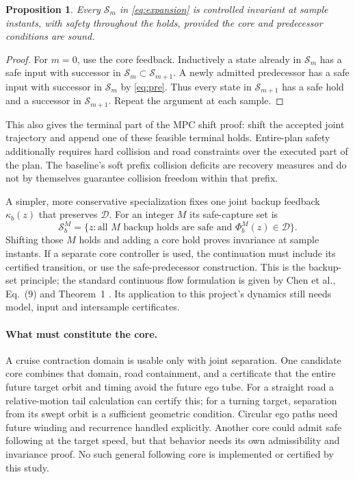 \documentclass[11pt]{article}
\newcommand{\D}{\mathcal D}
\newcommand{\Sf}{\mathcal S}
\newtheorem{proposition}{Proposition}
\begin{document}
\begin{proposition}
Every $\Sf_m$ in \eqref{eq:expansion} is controlled invariant at sample
instants, with safety throughout the holds, provided the core and
predecessor conditions are sound.
\end{proposition}
\begin{proof}
For $m=0$, use the core feedback. Inductively a state already in $\Sf_m$
has a safe input with successor in $\Sf_m\subset\Sf_{m+1}$. A newly
admitted predecessor has a safe input with successor in $\Sf_m$ by
\eqref{eq:pre}. Thus every state in $\Sf_{m+1}$ has a safe hold and a
successor in $\Sf_{m+1}$. Repeat the argument at each sample.
\end{proof}
This also gives the terminal part of the MPC shift proof: shift the
accepted joint trajectory and append one of these feasible terminal
holds. Entire-plan safety additionally requires hard collision and road
constraints over the executed part of the plan. The baseline's soft
prefix collision deficits are recovery measures and do not by themselves
guarantee collision freedom within that prefix.

A simpler, more conservative specialization fixes one joint backup
feedback $\kappa_b(z)$ that preserves $\D$. For an integer $M$ its
safe-capture set is
\begin{equation}
\Sf_b^M=\{z:\text{all }M\text{ backup holds are safe and }
\Phi_b^M(z)\in\D\}.\label{eq:backup}
\end{equation}
Shifting those $M$ holds and adding a core hold proves invariance at
sample instants. If a separate core controller is used, the continuation
must include its certified transition, or use the safe-predecessor
construction. This is the backup-set principle; the standard continuous
flow formulation is given by Chen et al., Eq.~(9) and Theorem~1
\cite{backup}. Its application to this project's dynamics still needs
model, input and intersample certificates.

\paragraph{What must constitute the core.}
A cruise contraction domain is usable only with joint separation. One
candidate core combines that domain, road containment, and a certificate
that the entire future target orbit and timing avoid the future ego tube.
For a straight road a relative-motion tail calculation can certify this;
for a turning target, separation from its swept orbit is a sufficient
geometric condition. Circular ego paths need future winding and recurrence
handled explicitly. Another core could admit safe following at the target
speed, but that behavior needs its own admissibility and invariance proof.
No such general following core is implemented or certified by this study.
\end{document}
